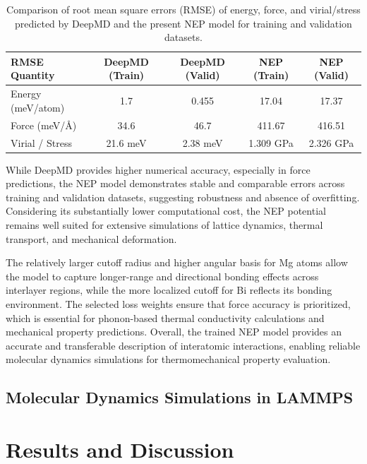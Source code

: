 \documentclass[review, 12pt]{elsarticle}
\numberwithin{equation}{section}
\begin{document}
\begin{table}[htb!]
\centering
\caption{Comparison of root mean square errors (RMSE) of energy, force, and virial/stress predicted by DeepMD and the present NEP model for training and validation datasets.}
\label{tab:rmse_comparison}
\renewcommand{\arraystretch}{1.2}
\begin{tabular}{lcccc}
\toprule
RMSE Quantity 
& DeepMD (Train) 
& DeepMD (Valid) 
& NEP (Train) 
& NEP (Valid) \\
\midrule
Energy (meV/atom)     
& 1.7   
& 0.455 
& 17.04 
& 17.37 \\

Force (meV/\AA)       
& 34.6  
& 46.7  
& 411.67
& 416.51 \\

Virial / Stress       
& 21.6 meV 
& 2.38 meV 
& 1.309 GPa
& 2.326 GPa\\
\bottomrule
\end{tabular}
\end{table}

While DeepMD provides higher numerical accuracy, especially in force predictions, the NEP model demonstrates stable and comparable errors across training and validation datasets, suggesting robustness and absence of overfitting. Considering its substantially lower computational cost, the NEP potential remains well suited for extensive simulations of lattice dynamics, thermal transport, and mechanical deformation.

The relatively larger cutoff radius and higher angular basis for Mg atoms allow the model to capture longer-range and directional bonding effects across interlayer regions, while the more localized cutoff for Bi reflects its bonding environment. The selected loss weights ensure that force accuracy is prioritized, which is essential for phonon-based thermal conductivity calculations and mechanical property predictions. Overall, the trained NEP model provides an accurate and transferable description of interatomic interactions, enabling reliable molecular dynamics simulations for thermomechanical property evaluation.


\subsection{Molecular Dynamics Simulations in LAMMPS}


\section{Results and Discussion}
\end{document}
